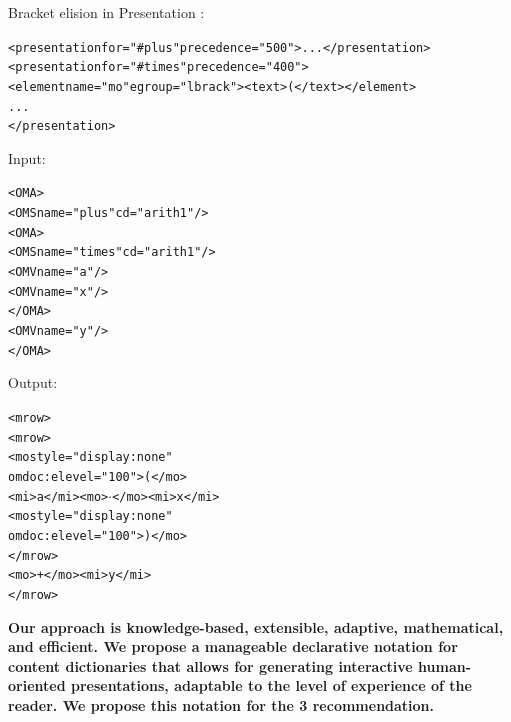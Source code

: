 \documentclass[a0,portrait]{a0poster}
\newcommand{\yellowbox}[1]{%
    \renewcommand{\rmdefault}{lmr}%
    \setlength{\fboxrule}{0.1cm}%
    \setlength{\fboxsep}{.5cm}%
    {\begin{center}%
    \fcolorbox{black}{light-yellow}%
    {\parbox{0.9\textwidth}%
    {\vspace{0.5cm} \bf \Large #1
    \vspace{0.5cm}}}\end{center}}%
    \renewcommand{\rmdefault}{ptm}}
\begin{document}
\begin{multicols}{2}
Bracket elision in Presentation {\mathml}:
{\small
\begin{alltt}
<presentation \textcolor{DarkRed!75}{for="#plus"} precedence="500">...</presentation>
<presentation \textcolor{DarkRed!75}{for="#times"} precedence="400">
  \textcolor{DarkGoldenrod!75}{<element name="mo" egroup="lbrack"><text>(</text></element>}
  ...
</presentation>
\end{alltt}}
    \begin{minipage}{.45\linewidth}
      {\normalsize Input:
\begin{alltt}
<OMA>
  \textcolor{DarkRed!75}{<OMS name="plus" cd="arith1"/>}
  <OMA>
    \textcolor{DarkRed!75}{<OMS name="times" cd="arith1"/>}
    <OMV name="a"/>
    <OMV name="x"/>
  </OMA>
  <OMV name="y"/>
</OMA>
\end{alltt}}
    \end{minipage}%
    \begin{minipage}{.45\linewidth}
      {\normalsize Output:
\begin{alltt}
<mrow>
  <mrow>
    \textcolor{DarkGoldenrod!75}{<mo style="display:none"
     omdoc:elevel="100">(</mo>}
    <mi>a</mi>\textcolor{DarkRed!75}{<mo>\(\cdot\)</mo>}<mi>x</mi>
    \textcolor{DarkGoldenrod!75}{<mo style="display:none"
     omdoc:elevel="100">)</mo>}
  </mrow>
  \textcolor{DarkRed!75}{<mo>+</mo>}<mi>y</mi>
</mrow>
\end{alltt}}
    \end{minipage}
\end{multicols}
\vspace{1cm} \yellowbox{Our approach is knowledge-based, extensible, adaptive,
  mathematical, and efficient.  We propose a manageable declarative notation for
  content dictionaries that allows for generating interactive human-oriented
  presentations, adaptable to the level of experience of the reader.  We propose
  this notation for the {\mathml} 3 recommendation.}
\end{document}
